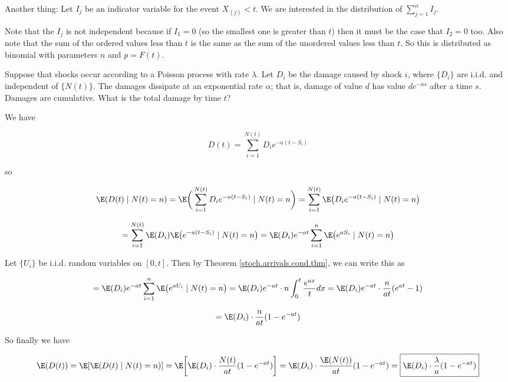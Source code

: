 \begin{example} Another thing: Let \(I_j\) be an indicator variable for the event \(X_{(j)} < t\). We are interested in the distribution of \(\sum_{j=1}^n I_j\).

\end{example} 

\begin{solution} Note that the \(I_j\) is not independent because if \(I_1 = 0\) (so the smallest one is greater than \(t\)) then it must be the case that \(I_2 =0\) too. Also note that the sum of the ordered values less than \(t\) is the same as the sum of the unordered values less than \(t\). So this is distributed as binomial with parameters \(n\) and \(p = F(t)\).

\end{solution}

\begin{example} Suppose that shocks occur according to a Poisson process with rate \(\lambda\). Let \(D_i\) be the damage caused by shock \(i\), where \(\{D_i\}\) are i.i.d. and independent of \(\{N(t)\}\). The damages dissipate at an exponential rate \(\alpha\); that is, damage of value \(d\) has value \(de^{-as}\) after a time \(s\). Damages are cumulative. What is the total damage by time \(t\)?

\end{example}

\begin{solution} We have

\[
D(t) = \sum_{i=1}^{N(t)} D_i e^{-a(t-S_i)}
\]

so

\[
\E(D(t) \mid N(t) = n) = \E \bigg(  \sum_{i=1}^{N(t)} D_i e^{-a(t-S_i)}  \mid N(t) = n \bigg) = \sum_{i=1}^{N(t)} \E \big( D_i e^{-a(t-S_i)}  \mid N(t) = n \big)
\]

\[
= \sum_{i=1}^{N(t)} \E ( D_i ) \E \big( e^{-a(t-S_i)}  \mid N(t) = n \big)  =  \E ( D_i )  e^{-at}\sum_{i=1}^{n}\E \big( e^{aS_i}  \mid N(t) = n \big)
\]

Let \(\{U_i\}\) be i.i.d. random variables on \([0, t]\). Then by Theorem \ref{stoch.arrivals.cond.thm}, we can write this as

\[
=  \E ( D_i )  e^{-at}\sum_{i=1}^{n}\E \big( e^{aU_i}  \mid N(t) = n \big) =  \E ( D_i ) e^{-at}   \cdot n \int_0^t     \frac{e^{ax} }{t} dx =  \E ( D_i ) e^{-at}   \cdot \frac{n}{at}( e^{at} - 1)  
\]

\[
=  \E ( D_i )   \cdot \frac{n}{at}( 1 - e^{-at} )  
\]

So finally we have

\[
\E(D(t)) = \E[ \E(D(t) \mid N(t) = n) ] = \E \bigg[  \E ( D_i )   \cdot \frac{N(t)}{at}( 1 - e^{-at} )  \bigg] = \E ( D_i )   \cdot \frac{\E(N(t))}{at}( 1 - e^{-at} )   = \boxed{\E ( D_i )   \cdot \frac{\lambda}{a}( 1 - e^{-at} )  }
\]

\end{solution}

